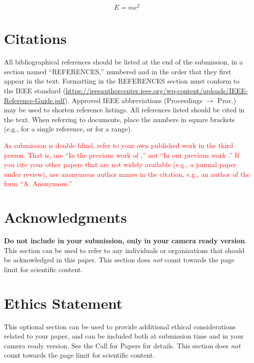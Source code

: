 \documentclass{article}
\begin{document}
\begin{equation}\label{relativity}
E=mc^{2}
\end{equation}

\section{Citations}

All bibliographical references should be listed at the end of the submission, in a section named ``REFERENCES,''
numbered and in the order that they first appear in the text. Formatting in the REFERENCES section must conform to the
IEEE standard (\url{https://ieeeauthorcenter.ieee.org/wp-content/uploads/IEEE-Reference-Guide.pdf}). Approved
IEEE abbreviations (Proceedings $\rightarrow$ Proc.) may be used to shorten reference listings. All references listed
should be cited in the text. When referring to documents, place the numbers in square brackets (e.g., \cite{ISMIR17Author:01}
for a single reference, or \cite{JNMR10Someone:01,Book20Person:01,Chapter09Person:01} for a range).

\textcolor{red}{As submission is double blind, refer to your own published work in the third person. That is, use ``In the previous work of \cite{ISMIR17Author:01},'' not ``In our previous work \cite{ISMIR17Author:01}.'' If you cite your other papers that are not widely available (e.g., a journal paper under review), use anonymous author names in the citation, e.g., an author of the form ``A. Anonymous.''}


\section{Acknowledgments}

\textbf{Do not include in your submission, only in your camera ready version}. This section can be used to refer to any
individuals or organizations that should be acknowledged in this paper. This section does \textit{not} count towards the 
page limit for scientific content.

\section{Ethics Statement}

This optional section can be used to provide additional ethical considerations related to your paper, and can be included
both at submission time and in your camera ready version. See the Call for Papers for details. This section does \textit{not} 
count towards the page limit for scientific content.
\end{document}
